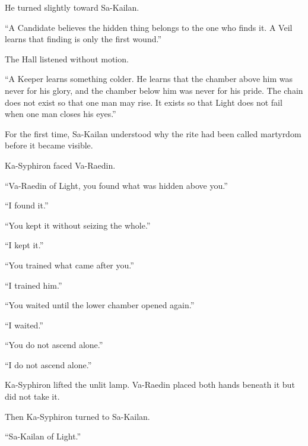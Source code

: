 He turned slightly toward Sa-Kailan.\par

“A Candidate believes the hidden thing belongs to the one who finds it. A Veil learns that finding is only the first wound.”\par

The Hall listened without motion.\par

“A Keeper learns something colder. He learns that the chamber above him was never for his glory, and the chamber below him was never for his pride. The chain does not exist so that one man may rise. It exists so that Light does not fail when one man closes his eyes.”\par

For the first time, Sa-Kailan understood why the rite had been called martyrdom before it became visible.\par

Ka-Syphiron faced Va-Raedin.\par

“Va-Raedin of Light, you found what was hidden above you.”\par

“I found it.”\par

“You kept it without seizing the whole.”\par

“I kept it.”\par

“You trained what came after you.”\par

“I trained him.”\par

“You waited until the lower chamber opened again.”\par

“I waited.”\par

“You do not ascend alone.”\par

“I do not ascend alone.”\par

Ka-Syphiron lifted the unlit lamp. Va-Raedin placed both hands beneath it but did not take it.\par

Then Ka-Syphiron turned to Sa-Kailan.\par

“Sa-Kailan of Light.”\par

